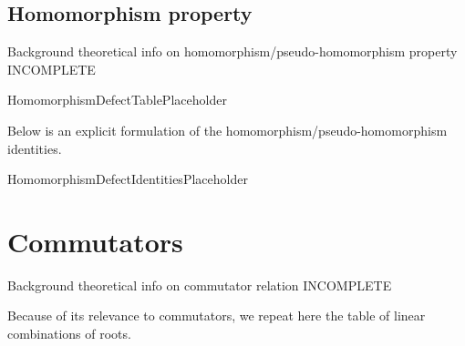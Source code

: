 \documentclass[11pt]{article}
\newcommand{\noi}{\noindent}
\theoremstyle{definition}
\begin{document}
\subsection{Homomorphism property}

\noi Background theoretical info on homomorphism/pseudo-homomorphism property INCOMPLETE

\bigskip

HomomorphismDefectTablePlaceholder

\noi Below is an explicit formulation of the homomorphism/pseudo-homomorphism identities.

\bigskip

HomomorphismDefectIdentitiesPlaceholder

\newpage
\section{Commutators}

\noi Background theoretical info on commutator relation INCOMPLETE

\noi Because of its relevance to commutators, we repeat here the table of linear combinations of roots.
\end{document}
